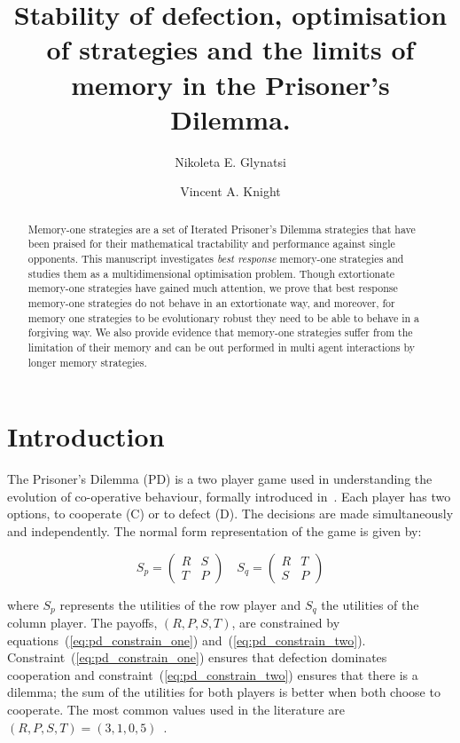 \documentclass[10pt]{article}
\title{Stability of defection, optimisation of strategies and the limits of
       memory in the Prisoner's Dilemma.}
\author{Nikoleta E. Glynatsi \and Vincent A. Knight}
\date{}
\begin{document}
\maketitle

\begin{abstract}
    Memory-one strategies are a set of Iterated Prisoner's Dilemma strategies
    that have been praised for their mathematical tractability and performance
    against single opponents. This manuscript investigates \textit{best
    response} memory-one strategies and studies them as a multidimensional
    optimisation problem. Though extortionate memory-one strategies have gained
    much attention, we prove that best response memory-one strategies do not
    behave in an extortionate way, and moreover, for memory one strategies to be
    evolutionary robust they need to be able to behave in a forgiving way. We
    also provide evidence that memory-one strategies suffer from the limitation
    of their memory and can be out performed in multi agent interactions by
    longer memory strategies.
\end{abstract}

\section{Introduction}\label{section:introduction}

The Prisoner's Dilemma (PD) is a two player game used in understanding the
evolution of co-operative behaviour, formally introduced in~\cite{Flood1958}.
Each player has two options, to cooperate (C) or to defect (D). The decisions
are made simultaneously and independently. The normal form representation of the
game is given by:

\begin{equation}\label{equ:pd_definition}
    S_p =
    \begin{pmatrix}
        R & S  \\
        T & P
    \end{pmatrix}
    \quad
    S_q =
    \begin{pmatrix}
        R & T  \\
        S & P
    \end{pmatrix}
\end{equation}

where \(S_p\) represents the utilities of the row player and \(S_q\) the
utilities of the column player. The payoffs, \((R, P, S, T)\), are constrained
by equations~(\ref{eq:pd_constrain_one}) and~(\ref{eq:pd_constrain_two}).
Constraint~(\ref{eq:pd_constrain_one}) ensures that
defection dominates cooperation and constraint~(\ref{eq:pd_constrain_two})
ensures that there is a dilemma; the sum of the utilities for both players is
better when both choose to cooperate. The most common values used in the literature are
\((R, P, S, T) = (3, 1, 0, 5)\)~\cite{Axelrod1981}.
\end{document}
